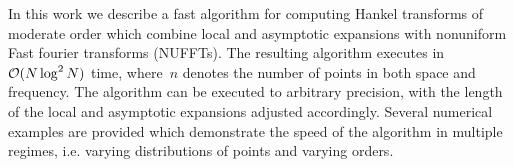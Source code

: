 In this work we describe a fast algorithm for computing Hankel transforms of
moderate order which combine local and asymptotic expansions with nonuniform
Fast fourier transforms (NUFFTs). The resulting algorithm executes in~$\mathcal{O} (N
\log^2 N)$ time, where~$n$ denotes the number of points in both space and
frequency.  The algorithm can be executed to arbitrary precision, with the
length of the local and asymptotic expansions adjusted accordingly. Several
numerical examples are provided which demonstrate the speed of the algorithm in
multiple regimes, i.e. varying distributions of points and varying orders.

